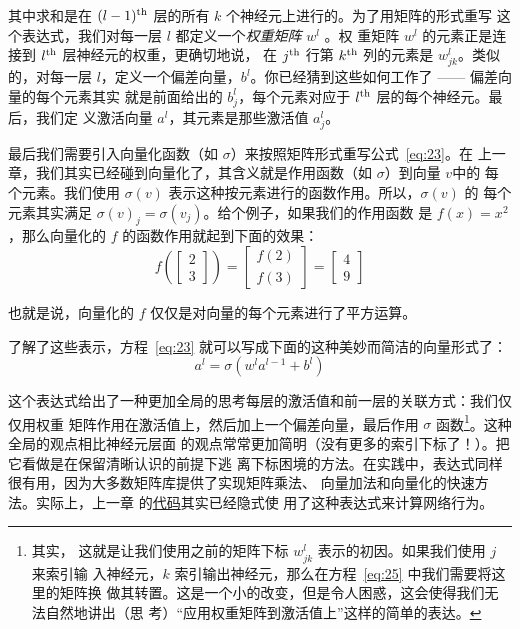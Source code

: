 其中求和是在 $(l-1)^{\rm th}$ 层的所有 $k$ 个神经元上进行的。为了用矩阵的形式重写
这个表达式，我们对每一层 $l$ 都定义一个\emph{权重矩阵} $w^l$ 。权
重矩阵 $w^l$ 的元素正是连接到 $l^{\rm th}$ 层神经元的权重，更确切地说，
在 $j^{\rm th}$ 行第 $k^{\rm th}$ 列的元素是 $w^l_{jk}$。类似的，对每一层
$l$，定义一个偏差向量，$b^l$。你已经猜到这些如何工作了 —— 偏差向量的每个元素其实
就是前面给出的 $b^l_j$，每个元素对应于 $l^{\rm th}$ 层的每个神经元。最后，我们定
义激活向量 $a^l$，其元素是那些激活值 $a^l_j$。

最后我们需要引入向量化函数（如 $\sigma$）来按照矩阵形式重写公式~\eqref{eq:23}。在
上一章，我们其实已经碰到向量化了，其含义就是作用函数（如 $\sigma$）到向量 $v$中的
每个元素。我们使用 $\sigma(v)$ 表示这种按元素进行的函数作用。所以，$\sigma(v)$ 的
每个元素其实满足 $\sigma(v)_j = \sigma(v_j)$。给个例子，如果我们的作用函数
是 $f(x) = x^2$，那么向量化的 $f$ 的函数作用就起到下面的效果：
\begin{equation}
  f\left(\left[ \begin{array}{c} 2 \\ 3 \end{array} \right] \right)
  = \left[ \begin{array}{c} f(2) \\ f(3) \end{array} \right]
  = \left[ \begin{array}{c} 4 \\ 9 \end{array} \right]
\label{eq:24}\tag{24}
\end{equation}

也就是说，向量化的 $f$ 仅仅是对向量的每个元素进行了平方运算。

了解了这些表示，方程~\eqref{eq:23} 就可以写成下面的这种美妙而简洁的向量形式了：
\begin{equation}
  a^{l} = \sigma(w^l a^{l-1}+b^l)
  \label{eq:25}\tag{25}
\end{equation}

这个表达式给出了一种更加全局的思考每层的激活值和前一层的关联方式：我们仅仅用权重
矩阵作用在激活值上，然后加上一个偏差向量，最后作用 $\sigma$ 函数\footnote{其实，
  这就是让我们使用之前的矩阵下标 $w_{jk}^l$ 表示的初因。如果我们使用 $j$ 来索引输
  入神经元，$k$ 索引输出神经元，那么在方程~\eqref{eq:25} 中我们需要将这里的矩阵换
  做其转置。这是一个小的改变，但是令人困惑，这会使得我们无法自然地讲出（思
  考）``应用权重矩阵到激活值上''这样的简单的表达。}。这种全局的观点相比神经元层面
的观点常常更加简明（没有更多的索引下标了！）。把它看做是在保留清晰认识的前提下逃
离下标困境的方法。在实践中，表达式同样很有用，因为大多数矩阵库提供了实现矩阵乘法、
向量加法和向量化的快速方法。实际上，上一章
的\hyperref[sec:implementing_our_network_to_classify_digits]{代码}其实已经隐式使
用了这种表达式来计算网络行为。

